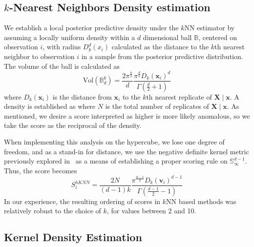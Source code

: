 \subsection{$k$-Nearest Neighbors Density estimation}
We establish a local posterior predictive density under the $k$NN estimator by 
  assuming a locally uniform density within a $d$ dimensional ball $\mathbb{B}$, 
  centered on observation $i$, with radius $D_{k}^d(x_i)$ calculated as the 
  distance to the $k$th nearest neighbor to observation $i$ in a sample from the 
  posterior predictive distribution. The volume of the ball is calculated as
  \begin{equation}
    \label{eq:vol_sphere}
    \text{Vol}(\mathbb{B}_d^k) = 
      \frac{2\pi^{\frac{n}{2}}}{d}
      \frac{\pi^{\frac{d}{2}}D_{k}(\bm{x}_i)^d}{\Gamma\left(\frac{d}{2} + 1\right)}
  \end{equation}
   where $D_k(\bm{x}_i)$ is the distance from 
  $\bm{x}_i$ to the $k$th nearest replicate of $\bm{X}\mid\bm{x}$.  A density is
  established as  where $N$ is the total number of 
  replicates of $\bm{X}\mid\bm{x}$.  As mentioned, we desire a score interpreted
  as higher is more likely anomalous, so we take the score as the reciprocal of 
  the density.

When implementing this analysis on the hypercube, we lose one degree of freedom,
  and as a stand-in for distance, we use the negative definite kernel metric 
  previously explored in~\cite{trubey:pg} as a means of establishing a proper 
  scoring rule on $\mathbb{S}_{\infty}^{d-1}$.  Thus, the score becomes
  \begin{equation}
    \label{eq:ad_knn_h}
    S_i^{hKNN} = \frac{2N}{(d-1)k}\frac{\pi^{\frac{d-1}{2}}D_{k}(\bm{v}_i)^{d-1}}{\Gamma\left(\frac{d-1}{2} - 1\right)}
  \end{equation}
  In our experience, the resulting ordering of
  scores in $k$NN based methods was relatively robust to the choice of $k$, for 
  values between 2 and 10.

\subsection{Kernel Density Estimation}


